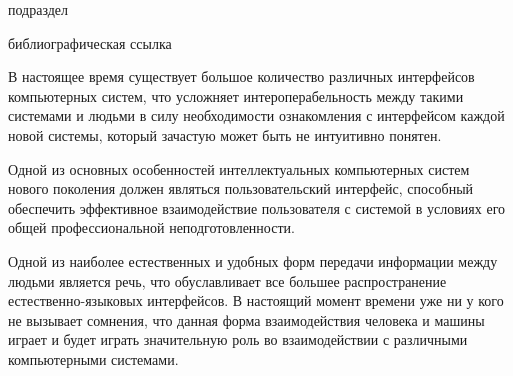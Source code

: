 \bigskip

\begin{SCn}
	\begin{scnrelfromlist}{подраздел}
	\end{scnrelfromlist}

\bigskip

	\begin{scnrelfromlist}{библиографическая ссылка}
	\end{scnrelfromlist}
\end{SCn}

\bigskip

В настоящее время существует большое количество различных интерфейсов компьютерных систем, что усложняет интероперабельность между такими системами и людьми в силу необходимости ознакомления с интерфейсом каждой новой системы, который зачастую может быть не интуитивно понятен.

Одной из основных особенностей интеллектуальных компьютерных систем нового поколения должен являться пользовательский интерфейс, способный обеспечить эффективное взаимодействие пользователя с системой в условиях его общей профессиональной неподготовленности.

Одной из наиболее естественных и удобных форм передачи информации между людьми является речь, что обуславливает все большее распространение естественно-языковых интерфейсов. В настоящий момент времени уже ни у кого не вызывает сомнения, что данная форма взаимодействия человека и машины играет и будет играть значительную роль во взаимодействии с различными компьютерными системами.

